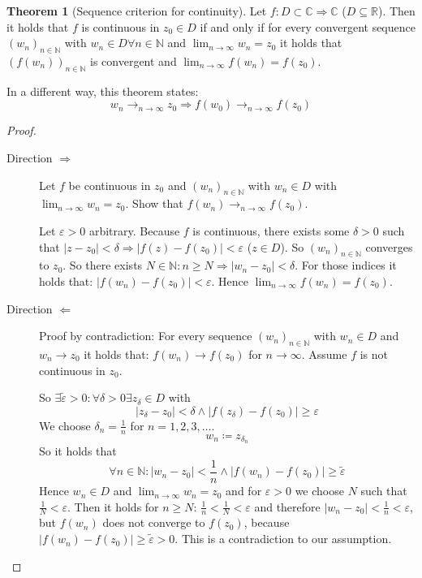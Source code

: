 \documentclass[a4paper,landscape,twocolumn]{article}
\theoremstyle{definition}
\newtheorem{theorem}{Theorem}
\newcommand\abs[1]{\left|#1\right|}
\newcommand\seq[1]{{\left(#1\right)}_{n \in \mathbb N}}
\begin{document}
\begin{theorem}[Sequence criterion for continuity]
  Let $f: D \subset \mathbb C \Rightarrow \mathbb C$ ($D \subseteq \mathbb R$).
  Then it holds that $f$ is continuous in $z_0 \in D$ if and only if
  for every convergent sequence $\seq{w_n}$ with $w_n \in D \forall n \in \mathbb N$
  and $\lim_{n\to\infty} w_n = z_0$ it holds that $\seq{f(w_n)}$ is convergent
  and $\lim_{n\to\infty} f(w_n) = f(z_0)$.

  In a different way, this theorem states:
  \[ w_n \to_{n\to\infty} z_0 \Rightarrow f(w_0) \to_{n\to\infty} f(z_0) \]
\end{theorem}
\begin{proof}
  \begin{description}
    \item[Direction $\Rightarrow$]
      Let $f$ be continuous in $z_0$ and $\seq{w_n}$ with $w_n \in D$ with $\lim_{n\to\infty} w_n = z_0$.
      Show that $f(w_n) \to_{n\to\infty} f(z_0)$.

      Let $\varepsilon > 0$ arbitrary. Because $f$ is continuous, there exists some $\delta > 0$
      such that $\abs{z - z_0} < \delta \Rightarrow \abs{f(z) - f(z_0)} < \varepsilon$ ($z \in D$).
      So $\seq{w_n}$ converges to $z_0$.
      So there exists $N \in \mathbb N: n \geq N \Rightarrow \abs{w_n - z_0} < \delta$.
      For those indices it holds that: $\abs{f(w_n) - f(z_0)} < \varepsilon$.
      Hence $\lim_{n\to\infty} f(w_n) = f(z_0)$.
    \item[Direction $\Leftarrow$]
      Proof by contradiction: For every sequence $\seq{w_n}$ with $w_n \in D$ and $w_n \to z_0$
      it holds that: $f(w_n) \to f(z_0)$ for $n \to \infty$.
      Assume $f$ is not continuous in $z_0$.

      So $\exists \tilde{\varepsilon} > 0: \forall \delta > 0 \exists z_\delta \in D$ with
      \[ \abs{z_\delta - z_0} < \delta \land \abs{f(z_\delta) - f(z_0)} \geq \varepsilon \]
      We choose $\delta_n = \frac1n$ for $n = 1,2,3,\ldots$.
      \[ w_n \coloneqq z_{\delta_n} \]
      So it holds that
      \[ \forall n \in \mathbb N: \abs{w_n - z_0} < \frac1n \land \abs{f(w_n) - f(z_0)} \geq \tilde\varepsilon \]
      Hence $w_n \in D$ and $\lim_{n\to\infty} w_n = z_0$ and for $\varepsilon > 0$ we choose $N$
      such that $\frac1N < \varepsilon$. Then it holds for $n \geq N$: $\frac1n < \frac1N < \varepsilon$
      and therefore $\abs{w_n - z_0} < \frac1n < \varepsilon$, but $f(w_n)$ does not converge to $f(z_0)$,
      because $\abs{f(w_n) - f(z_0)} \geq \tilde{\varepsilon} > 0$. This is a contradiction to our assumption.
  \end{description}
\end{proof}
\end{document}
